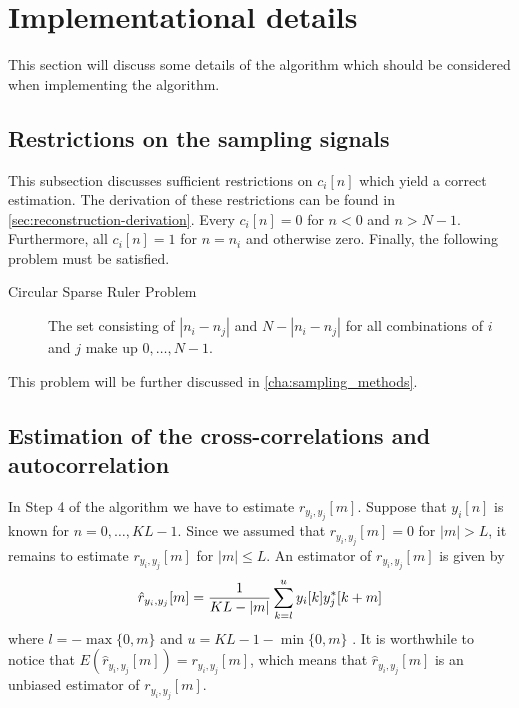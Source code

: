 \documentclass[a4paper, openany, oneside]{memoir}
\begin{document}
\section{Implementational details}
\label{sec:reconstruction-implementation}
This section will discuss some details of the algorithm which should be considered when implementing the algorithm.

\subsection{Restrictions on the sampling signals}
\label{sub:reconstruction-ci}
This subsection discusses sufficient restrictions on $c_i[n]$ which yield a correct estimation. The derivation of these restrictions can be found in \cref{sec:reconstruction-derivation}. Every $c_i[n]=0$ for $n < 0$ and $n > N-1$. Furthermore, all $c_i[n]=1$ for $n=n_i$ and otherwise zero. Finally, the following problem must be satisfied.

\begin{description}
    \item[Circular Sparse Ruler Problem] The set consisting of $|n_i - n_j|$ and $N-|n_i-n_j|$ for all combinations of $i$ and $j$ make up $0,\ldots,N-1$.
\end{description}

This problem will be further discussed in \cref{cha:sampling_methods}.

\subsection{Estimation of the cross-correlations and autocorrelation}
\label{sub:reconstruction-estimation}
In Step 4 of the algorithm we have to estimate $r_{y_i,y_j}[m]$. Suppose that $y_i[n]$ is known for $n = 0,\ldots,KL-1$. Since we assumed that $r_{y_i,y_j}[m]=0$ for $|m|>L$, it remains to estimate $r_{y_i,y_j}[m]$ for $|m| \le L$. An estimator of $r_{y_i,y_j}[m]$ is given by
\begin{align*}
    \hat{r}_{y_i,y_j}[m] = \frac{1}{KL-|m|}\sum_{k=l}^{u}y_i[k]y^*_j[k+m]
\end{align*}
where $l=-\max\{0,m\}$ and $u=KL-1-\min\{0,m\}$ \cite{hayes1996statistical}. It is worthwhile to notice that $E(\hat{r}_{y_i,y_j}[m])=r_{y_i,y_j}[m]$, which means that $\hat{r}_{y_i,y_j}[m]$ is an unbiased estimator of $r_{y_i,y_j}[m]$.
\end{document}
